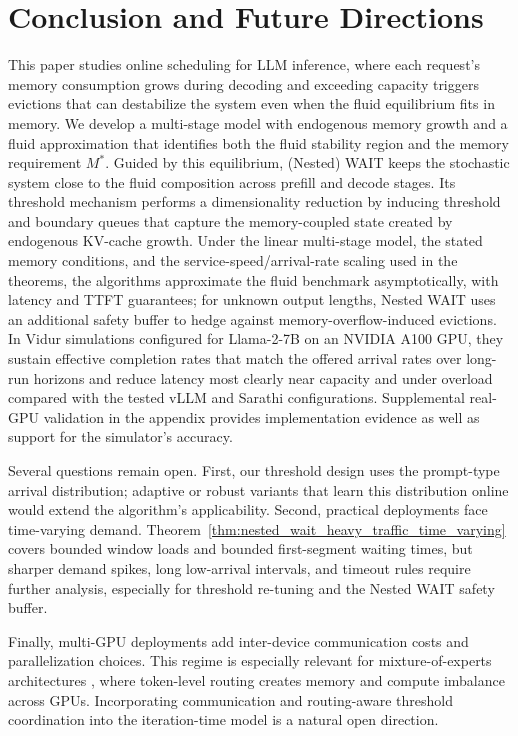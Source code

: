 \section{Conclusion and Future Directions}

This paper studies online scheduling for LLM inference, where each request's memory consumption grows during decoding and exceeding capacity triggers evictions that can destabilize the system even when the fluid equilibrium fits in memory. We develop a multi-stage model with endogenous memory growth and a fluid approximation that identifies both the fluid stability region and the memory requirement \(M^*\). Guided by this equilibrium, (Nested) WAIT keeps the stochastic system close to the fluid composition across prefill and decode stages. Its threshold mechanism performs a dimensionality reduction by inducing threshold and boundary queues that capture the memory-coupled state created by endogenous KV-cache growth. Under the linear multi-stage model, the stated memory conditions, and the service-speed/arrival-rate scaling used in the theorems, the algorithms approximate the fluid benchmark asymptotically, with latency and TTFT guarantees; for unknown output lengths, Nested WAIT uses an additional safety buffer to hedge against memory-overflow-induced evictions. In Vidur simulations configured for Llama-2-7B on an NVIDIA A100 GPU, they sustain effective completion rates that match the offered arrival rates over long-run horizons and reduce latency most clearly near capacity and under overload compared with the tested vLLM and Sarathi configurations. Supplemental real-GPU validation in the appendix provides implementation evidence as well as support for the simulator's accuracy.

Several questions remain open. First, our threshold design uses the prompt-type arrival distribution; adaptive or robust variants that learn this distribution online would extend the algorithm's applicability. Second, practical deployments face time-varying demand. Theorem~\ref{thm:nested_wait_heavy_traffic_time_varying} covers bounded window loads and bounded first-segment waiting times, but sharper demand spikes, long low-arrival intervals, and timeout rules require further analysis, especially for threshold re-tuning and the Nested WAIT safety buffer.

Finally, multi-GPU deployments add inter-device communication costs and parallelization choices. This regime is especially relevant for mixture-of-experts architectures \citep{shazeer2017outrageously, fedus2022switch, jiang2024mixtral}, where token-level routing creates memory and compute imbalance across GPUs. Incorporating communication and routing-aware threshold coordination into the iteration-time model is a natural open direction.
